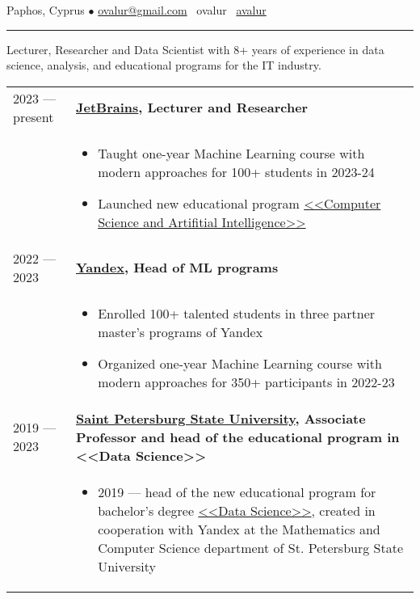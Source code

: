 \documentclass[11pt]{article}
\begin{document}
%

\vspace{0.5em}

\noindent Paphos, Cyprus $\bullet$ \href{mailto:ovalur@gmail.com}{ovalur@gmail.com} \faSendO~ovalur
\faGithub~\href{https://github.com/avalur}{avalur}

\vspace{0.5em}
\hrule
\vspace{0.5em}

Lecturer, Researcher and Data Scientist with 8+ years of experience in data science,
analysis, and educational programs for the IT industry.

\vspace{0.5em}
\begin{longtable} {l | p{}}
2023 — present & {\textbf{\href{https://jetbrains.com}{JetBrains}, Lecturer and Researcher}} \\
& \vspace{-1.5em} 
	\begin{itemize}
		\item Taught one-year Machine Learning course with modern approaches for 100+ students in 2023-24
		\item Launched new educational program \href{https://blog.jetbrains.com/education/2023/05/03/introducing-the-computer-science-and-artificial-intelligence-bachelor-s-program-with-neapolis-university-paphos/}{<<Computer Science and Artifitial Intelligence>>}
	\end{itemize} \\
2022 — 2023 & {\textbf{\href{https://ya.ru/}{Yandex}, Head of ML programs}} \\
& \vspace{-1.5em}
	\begin{itemize}
		\item Enrolled 100+ talented students in three partner master's programs of Yandex
		\item Organized one-year Machine Learning course with modern approaches for 350+ participants in 2022-23
	\end{itemize} \\
2019 — 2023 & {\textbf{\href{https://english.spbu.ru/}{Saint Petersburg State University}, Associate Professor and head of the educational program in <<Data Science>>}} \\
& \vspace{-1.5em}
\begin{itemize}
\item 2019 — head of the new educational program for bachelor's degree \href{https://maad.compscicenter.ru}{<<Data Science>>}, created in cooperation with Yandex at the Mathematics and Computer Science department of St. Petersburg State University


\end{itemize}
\end{longtable}
\end{document}
